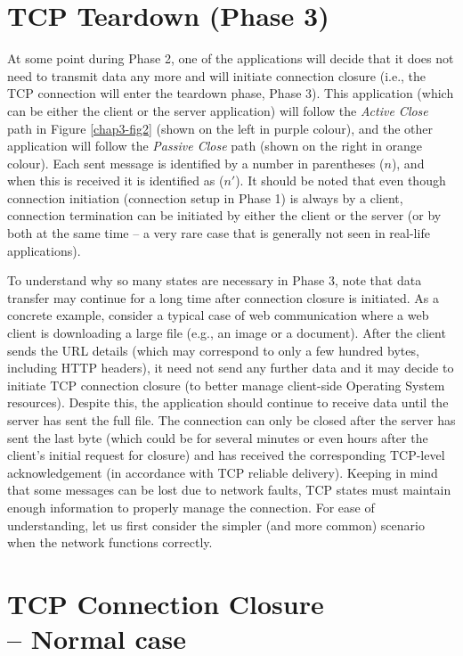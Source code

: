\begin{multicols}{2}
\section{TCP Teardown (Phase 3)}

At some point during Phase 2, one of the applications will decide that it does not need to transmit data any more and will initiate connection closure (i.e., the TCP connection will enter the teardown phase, Phase 3). This application (which can be either the client or the server application) will follow the \textit{Active Close} path in Figure \ref{chap3-fig2} (shown on the left in purple colour), and the other application will follow the \textit{Passive Close} path (shown on the right in orange colour). Each sent message is identified by a number in parentheses ($n$), and when this is received it is identified as ($n'$). It should be noted that even though connection initiation (connection setup in Phase 1) is always by a client, connection termination can be initiated by either the client or the server (or by both at the same time -- a very rare case that is generally not seen in real-life applications).

To understand why so many states are necessary in Phase 3, note that data transfer may continue for a long time after connection closure is initiated. As a concrete example, consider a typical case of web communication where a web client is downloading a large file (e.g., an image or a document). After the client sends the URL details (which may correspond to only a few hundred bytes, including HTTP headers), it need not send any further data and it may decide to initiate TCP connection closure (to better manage client-side Operating System resources). Despite this, the application should continue to receive data until the server has sent the full file. The connection can only be closed after the server has sent the last byte (which could be for several minutes or even hours after the client’s initial request for closure) and has received the corresponding TCP-level acknowledgement (in accordance with TCP reliable delivery). Keeping in mind that some messages can be lost due to network faults, TCP states must maintain enough information to properly manage the connection. For ease of understanding, let us first consider the simpler (and more common) scenario when the network functions correctly.

\section{TCP Connection Closure\\ -- Normal case}


\end{multicols}
